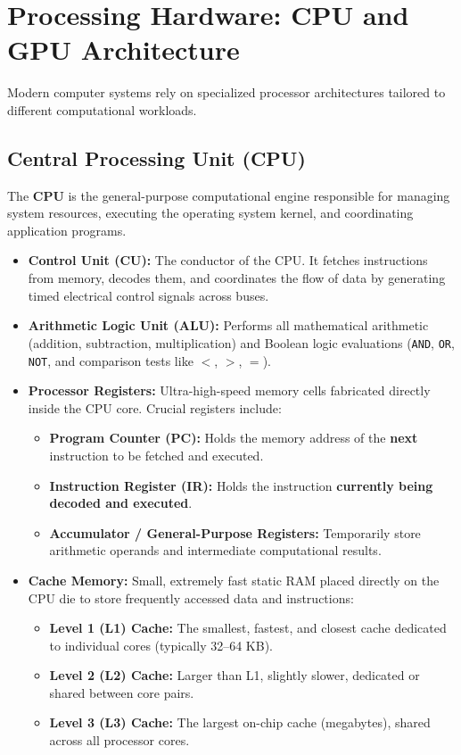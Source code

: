 \section{Processing Hardware: CPU and GPU Architecture}

Modern computer systems rely on specialized processor architectures tailored to different computational workloads.

\subsection{Central Processing Unit (CPU)}
The \textbf{CPU} is the general-purpose computational engine responsible for managing system resources, executing the operating system kernel, and coordinating application programs.

\begin{definition}
\begin{itemize}[leftmargin=1.2em]
    \item \textbf{Control Unit (CU):} The conductor of the CPU. It fetches instructions from memory, decodes them, and coordinates the flow of data by generating timed electrical control signals across buses.
    \item \textbf{Arithmetic Logic Unit (ALU):} Performs all mathematical arithmetic (addition, subtraction, multiplication) and Boolean logic evaluations (\texttt{AND}, \texttt{OR}, \texttt{NOT}, and comparison tests like $<$, $>$, $=$).
    \item \textbf{Processor Registers:} Ultra-high-speed memory cells fabricated directly inside the CPU core. Crucial registers include:
    \begin{itemize}
        \item \textbf{Program Counter (PC):} Holds the memory address of the \textbf{next} instruction to be fetched and executed.
        \item \textbf{Instruction Register (IR):} Holds the instruction \textbf{currently being decoded and executed}.
        \item \textbf{Accumulator / General-Purpose Registers:} Temporarily store arithmetic operands and intermediate computational results.
    \end{itemize}
    \item \textbf{Cache Memory:} Small, extremely fast static RAM placed directly on the CPU die to store frequently accessed data and instructions:
    \begin{itemize}
        \item \textbf{Level 1 (L1) Cache:} The smallest, fastest, and closest cache dedicated to individual cores (typically 32--64 KB).
        \item \textbf{Level 2 (L2) Cache:} Larger than L1, slightly slower, dedicated or shared between core pairs.
        \item \textbf{Level 3 (L3) Cache:} The largest on-chip cache (megabytes), shared across all processor cores.
    \end{itemize}
\end{itemize}
\end{definition}

